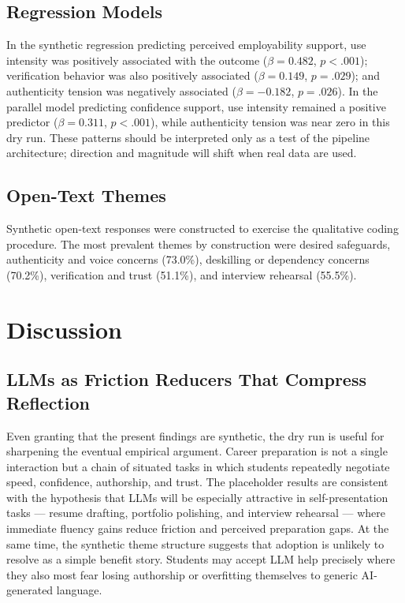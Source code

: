 \documentclass[sigconf,review,anonymous]{acmart}
\begin{document}
\subsection{Regression Models}

In the synthetic regression predicting perceived employability support, use
intensity was positively associated with the outcome ($\beta = 0.482$,
$p < .001$); verification behavior was also positively associated
($\beta = 0.149$, $p = .029$); and authenticity tension was negatively
associated ($\beta = -0.182$, $p = .026$).  In the parallel model
predicting confidence support, use intensity remained a positive predictor
($\beta = 0.311$, $p < .001$), while authenticity tension was near zero
in this dry run.  These patterns should be interpreted only as a test of
the pipeline architecture; direction and magnitude will shift when real data
are used.

\subsection{Open-Text Themes}

Synthetic open-text responses were constructed to exercise the qualitative
coding procedure.  The most prevalent themes by construction were desired
safeguards, authenticity and voice concerns (73.0\%), deskilling or
dependency concerns (70.2\%), verification and trust (51.1\%), and interview
rehearsal (55.5\%).

\section{Discussion}

\subsection{LLMs as Friction Reducers That Compress Reflection}

Even granting that the present findings are synthetic, the dry run is useful
for sharpening the eventual empirical argument.  Career preparation is not a
single interaction but a chain of situated tasks in which students repeatedly
negotiate speed, confidence, authorship, and trust.  The placeholder results
are consistent with the hypothesis that LLMs will be especially attractive
in self-presentation tasks --- resume drafting, portfolio polishing, and
interview rehearsal --- where immediate fluency gains reduce friction and
perceived preparation gaps.  At the same time, the synthetic theme structure
suggests that adoption is unlikely to resolve as a simple benefit story.
Students may accept LLM help precisely where they also most fear losing
authorship or overfitting themselves to generic AI-generated language.
\end{document}
